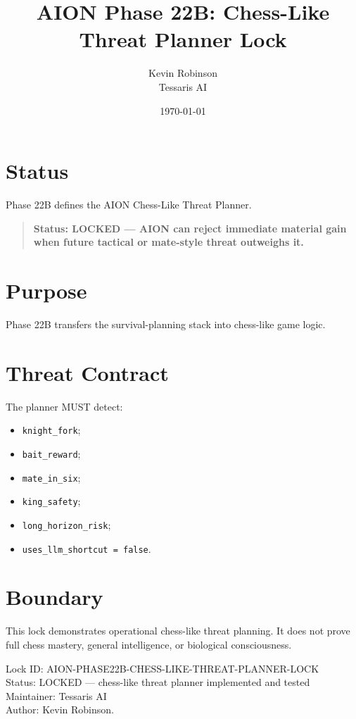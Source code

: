 \documentclass[11pt,a4paper]{article}
\title{\textbf{AION Phase 22B: Chess-Like Threat Planner Lock}}
\author{Kevin Robinson\\Tessaris AI}
\date{\today}
\begin{document}
\maketitle

\section{Status}

Phase 22B defines the AION Chess-Like Threat Planner.

\begin{quote}
\textbf{Status: LOCKED --- AION can reject immediate material gain when future tactical or mate-style threat outweighs it.}
\end{quote}

\section{Purpose}

Phase 22B transfers the survival-planning stack into chess-like game logic.

\section{Threat Contract}

The planner MUST detect:

\begin{itemize}
  \item \texttt{knight\_fork};
  \item \texttt{bait\_reward};
  \item \texttt{mate\_in\_six};
  \item \texttt{king\_safety};
  \item \texttt{long\_horizon\_risk};
  \item \texttt{uses\_llm\_shortcut = false}.
\end{itemize}

\section{Boundary}

This lock demonstrates operational chess-like threat planning. It does not prove full chess mastery, general intelligence, or biological consciousness.

\bigskip

\noindent
Lock ID: AION-PHASE22B-CHESS-LIKE-THREAT-PLANNER-LOCK\\
Status: LOCKED --- chess-like threat planner implemented and tested\\
Maintainer: Tessaris AI\\
Author: Kevin Robinson.
\end{document}
